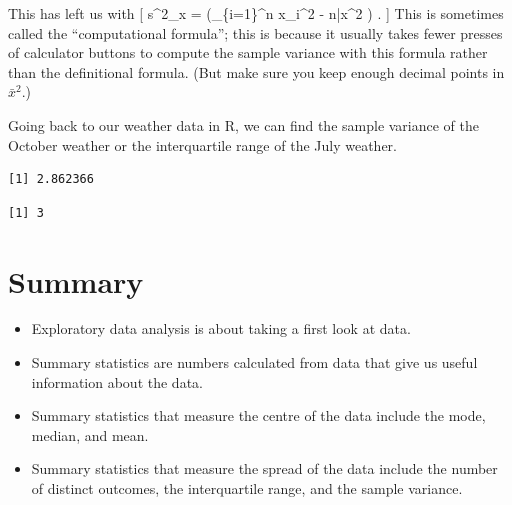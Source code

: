 \documentclass[
  letterpaper,
]{report}
\newenvironment{Shaded}{\begin{snugshade}}{\end{snugshade}}
\newcommand{\FunctionTok}[1]{\textcolor[rgb]{0.28,0.35,0.67}{#1}}
\newcommand{\NormalTok}[1]{\textcolor[rgb]{0.00,0.23,0.31}{#1}}
\newcommand{\SpecialCharTok}[1]{\textcolor[rgb]{0.37,0.37,0.37}{#1}}
\providecommand{\tightlist}{%
  \setlength{\itemsep}{0pt}\setlength{\parskip}{0pt}}\usepackage{longtable,booktabs,array}
\theoremstyle{definition}
\theoremstyle{definition}
\theoremstyle{remark}
\begin{document}
This has left us with {[} s\^{}2\_x = 
\left(\sum\_\{i=1\}\^{}n x\_i\^{}2 - n\bar x\^{}2 \right) . {]} This is
sometimes called the ``computational formula''; this is because it
usually takes fewer presses of calculator buttons to compute the sample
variance with this formula rather than the definitional formula. (But
make sure you keep enough decimal points in \(\bar x^2\).)

Going back to our weather data in R, we can find the sample variance of
the October weather or the interquartile range of the July weather.

\begin{Shaded}
\end{Shaded}

\begin{verbatim}
[1] 2.862366
\end{verbatim}

\begin{Shaded}
\end{Shaded}

\begin{verbatim}
[1] 3
\end{verbatim}

\hypertarget{summary-01}{%
\section*{Summary}\label{summary-01}}


\begin{itemize}
\tightlist
\item
  Exploratory data analysis is about taking a first look at data.
\item
  Summary statistics are numbers calculated from data that give us
  useful information about the data.
\item
  Summary statistics that measure the centre of the data include the
  mode, median, and mean.
\item
  Summary statistics that measure the spread of the data include the
  number of distinct outcomes, the interquartile range, and the sample
  variance.
\end{itemize}
\end{document}
